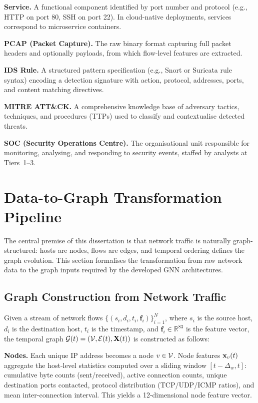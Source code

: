 \noindent\textbf{Service.} A functional component identified by port number and protocol (e.g., HTTP on port 80, SSH on port 22). In cloud-native deployments, services correspond to microservice containers.

\noindent\textbf{PCAP (Packet Capture).} The raw binary format capturing full packet headers and optionally payloads, from which flow-level features are extracted.

\noindent\textbf{IDS Rule.} A structured pattern specification (e.g., Snort or Suricata rule syntax) encoding a detection signature with action, protocol, addresses, ports, and content matching directives.

\noindent\textbf{MITRE ATT\&CK.} A comprehensive knowledge base of adversary tactics, techniques, and procedures (TTPs) used to classify and contextualise detected threats.

\noindent\textbf{SOC (Security Operations Centre).} The organisational unit responsible for monitoring, analysing, and responding to security events, staffed by analysts at Tiers~1--3.


\section{Data-to-Graph Transformation Pipeline}
\label{sec:data_to_graph}

The central premise of this dissertation is that network traffic is naturally graph-structured: hosts are nodes, flows are edges, and temporal ordering defines the graph evolution. This section formalises the transformation from raw network data to the graph inputs required by the developed GNN architectures.

\subsection{Graph Construction from Network Traffic}

Given a stream of network flows $\{(s_i, d_i, t_i, \mathbf{f}_i)\}_{i=1}^{N}$, where $s_i$ is the source host, $d_i$ is the destination host, $t_i$ is the timestamp, and $\mathbf{f}_i\in\mathbb{R}^{83}$ is the feature vector, the temporal graph $\mathcal{G}(t)=(\mathcal{V},\mathcal{E}(t),\mathbf{X}(t))$ is constructed as follows:

\noindent\textbf{Nodes.} Each unique IP address becomes a node $v\in\mathcal{V}$. Node features $\mathbf{x}_v(t)$ aggregate the host-level statistics computed over a sliding window $[t-\Delta_w, t]$: cumulative byte counts (sent/received), active connection counts, unique destination ports contacted, protocol distribution (TCP/UDP/ICMP ratios), and mean inter-connection interval. This yields a 12-dimensional node feature vector.

